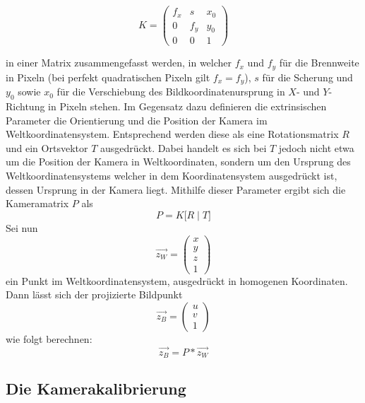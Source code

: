 \begin{equation}
K = \begin{pmatrix}
f_x & s & x_0 \\
0 & f_y & y_0 \\
0 & 0 & 1 
\end{pmatrix}
\end{equation}

 in einer Matrix zusammengefasst werden, in welcher \(f_x\) und \(f_y\) für die Brennweite in Pixeln (bei perfekt quadratischen Pixeln gilt \(f_x = f_y\)), \(s\) für die Scherung und \(y_0\) sowie \(x_0\) für die Verschiebung des Bildkoordinatenursprung in \(X\)- und \(Y\)-Richtung in Pixeln stehen. 
\newline
Im Gegensatz dazu definieren die extrinsischen Parameter die Orientierung und die Position der Kamera im Weltkoordinatensystem. Entsprechend werden diese als eine Rotationsmatrix \(R\) und ein Ortsvektor \(T\) ausgedrückt. Dabei handelt es sich bei \(T\) jedoch nicht etwa um die Position der Kamera in Weltkoordinaten, sondern um den Ursprung des Weltkoordinatensystems welcher in dem Koordinatensystem ausgedrückt ist, dessen Ursprung in der Kamera liegt.
\newline
Mithilfe dieser Parameter ergibt sich die Kameramatrix \(P\) als
\begin{equation}
	P = K \big[ R \mid T \big] 
\end{equation}
Sei nun 
\begin{equation}
	\vec{z_{W}} = \left(\begin{array}{c}x\\y\\z\\1\end{array}\right)
\end{equation}
ein Punkt im Weltkoordinatensystem, ausgedrückt in homogenen Koordinaten. Dann lässt sich der projizierte Bildpunkt
\begin{equation}
	\vec{z_{B}} = \left(\begin{array}{c}u\\v\\1\end{array}\right)
\end{equation}
wie folgt berechnen:
\begin{equation}
	\vec{z_{B}} = P * \vec{z_{W}}
\end{equation}


\subsection{Die Kamerakalibrierung}
\label{subsec:KameraKalibrierungTheorie}


